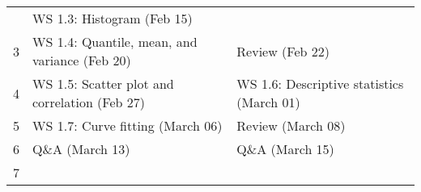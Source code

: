 \documentclass[
]{article}
\begin{document}
\begin{longtable}[]{@{}lll@{}}
\begin{minipage}[t]{0.38\columnwidth}
\end{minipage} & \begin{minipage}[t]{0.36\columnwidth}\raggedright
WS 1.3: Histogram (Feb 15)\strut
\end{minipage}\tabularnewline
\begin{minipage}[t]{0.18\columnwidth}\raggedright
3\strut
\end{minipage} & \begin{minipage}[t]{0.38\columnwidth}\raggedright
WS 1.4: Quantile, mean, and variance (Feb 20)\strut
\end{minipage} & \begin{minipage}[t]{0.36\columnwidth}\raggedright
Review (Feb 22)\strut
\end{minipage}\tabularnewline
\begin{minipage}[t]{0.18\columnwidth}\raggedright
4\strut
\end{minipage} & \begin{minipage}[t]{0.38\columnwidth}\raggedright
WS 1.5: Scatter plot and correlation (Feb 27)\strut
\end{minipage} & \begin{minipage}[t]{0.36\columnwidth}\raggedright
WS 1.6: Descriptive statistics (March 01)\strut
\end{minipage}\tabularnewline
\begin{minipage}[t]{0.18\columnwidth}\raggedright
5\strut
\end{minipage} & \begin{minipage}[t]{0.38\columnwidth}\raggedright
WS 1.7: Curve fitting (March 06)\strut
\end{minipage} & \begin{minipage}[t]{0.36\columnwidth}\raggedright
Review (March 08)\strut
\end{minipage}\tabularnewline
\begin{minipage}[t]{0.18\columnwidth}\raggedright
6\strut
\end{minipage} & \begin{minipage}[t]{0.38\columnwidth}\raggedright
Q\&A (March 13)\strut
\end{minipage} & \begin{minipage}[t]{0.36\columnwidth}\raggedright
Q\&A (March 15)\strut
\end{minipage}\tabularnewline
\begin{minipage}[t]{0.18\columnwidth}\raggedright
7\strut
\end{minipage} & \begin{minipage}[t]{0.38\columnwidth}\raggedright

\end{minipage}
\end{longtable}
\end{document}
